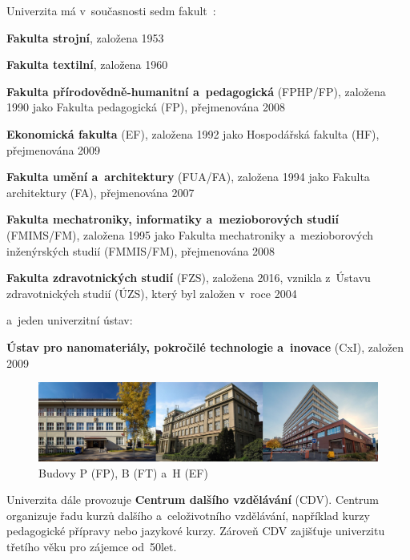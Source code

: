 \documentclass[a4paper,12pt,fonts]{./tulpackage/tularticle}
\begin{document}
Univerzita má v~současnosti sedm fakult~\cite{golka,jandova}:
\begin{itemize*}
  \setlength{\itemsep}{-4pt}
  \item \textbf{Fakulta strojní}, založena 1953
  \item \textbf{Fakulta textilní}, založena 1960
  \item \textbf{Fakulta přírodovědně-humanitní a~pedagogická} (FPHP/FP), založena 1990 jako Fakulta pedagogická (FP), přejmenována 2008
  \item \textbf{Ekonomická fakulta} (EF), založena 1992 jako Hospodářská fakulta (HF), přejmenována 2009
  \item \textbf{Fakulta umění a~architektury} (FUA/FA), založena 1994 jako Fakulta architektury (FA), přejmenována 2007
  \item \textbf{Fakulta mechatroniky, informatiky a~mezioborových studií} (FMIMS/FM), založena 1995 jako Fakulta mechatroniky a~mezioborových inženýrských studií (FMMIS/FM), přejmenována 2008
  \item \textbf{Fakulta zdravotnických studií} (FZS), založena 2016, vznikla z~Ústavu zdravotnických studií (ÚZS), který byl založen v~roce 2004
\end{itemize*}

a~jeden univerzitní ústav:
\begin{itemize*}
  \setlength{\itemsep}{-4pt}
  \item \textbf{Ústav pro nanomateriály, pokročilé technologie a~inovace} (CxI), založen 2009
\end{itemize*}

\vspace{1em}
\begin{figure}[H]
  \centering
  \includegraphics[width=0.9\linewidth]{pictures/budovy_p_b_t_tul.jpg}
  \caption{Budovy P (FP), B (FT) a~H (EF)}
  \label{fig:budovy-fp-ft-ef}
\end{figure}

Univerzita dále provozuje \textbf{Centrum dalšího vzdělávání} (CDV). Centrum organizuje řadu kurzů dalšího a~celoživotního vzdělávání, například kurzy pedagogické přípravy nebo jazykové kurzy. Zároveň CDV zajišťuje univerzitu třetího věku pro zájemce od~50\thinspace{}let.~\cite{jandova} %
\end{document}
